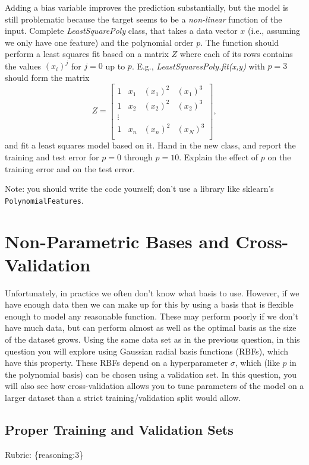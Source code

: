 \documentclass{article}
\def\rubric#1{\gre{Rubric: \{#1\}}}{}
\def\blu#1{{\color{blu}#1}}
\def\gre#1{{\color{gre}#1}}
\begin{document}
Adding a bias variable improves the prediction substantially, but the model is still problematic because the target seems to be a \emph{non-linear} function of the input.
Complete \emph{LeastSquarePoly} class, that takes a data vector $x$ (i.e., assuming we only have one feature) and the polynomial order $p$. The function should perform a least squares fit based on a matrix $Z$ where each of its rows contains the values $(x_{i})^j$ for $j=0$ up to $p$. E.g., \emph{LeastSquaresPoly.fit(x,y)}  with $p = 3$ should form the matrix
\[
Z =
\left[\begin{array}{cccc}
1 & x_1 & (x_1)^2 & (x_1)^3\\
1 & x_2 & (x_2)^2 & (x_2)^3\\
\vdots\\
1 & x_n & (x_n)^2 & (x_N)^3\\
\end{array}
\right],
\]
and fit a least squares model based on it.
\blu{Hand in the new class, and report the training and test error for $p = 0$ through $p= 10$. Explain the effect of $p$ on the training error and on the test error.}

Note: you should write the code yourself; don't use a library like sklearn's \texttt{PolynomialFeatures}.


\section{Non-Parametric Bases and Cross-Validation}

Unfortunately, in practice we often don't know what basis to use.
However, if we have enough data then we can make up for this by using a basis that is flexible enough to
model any reasonable function. These may perform poorly if we don't have much data, but can
 perform almost as well as the optimal basis as the size of the dataset grows.
Using the same data set as in the previous question, 
in this question you will explore using Gaussian radial basis functions (RBFs),
 which have this property. These RBFs depend on a hyperparameter $\sigma$, which
 (like $p$ in the polynomial basis) can be chosen using a validation set.
 In this question, you will also see how cross-validation allows you to tune
 parameters of the model on a larger dataset than a strict training/validation split would allow.


\subsection{Proper Training and Validation Sets}
\rubric{reasoning:3}
\end{document}
